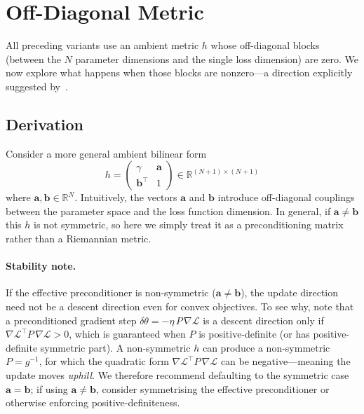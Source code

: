 \documentclass{article}
\newcommand{\loss}{\mathcal{L}}
\newcommand{\vecb}[1]{\boldsymbol{#1}}
\begin{document}
\section{Off-Diagonal Metric}\label{sec:offdiag}

All preceding variants use an ambient metric $h$ whose off-diagonal blocks
(between the $N$ parameter dimensions and the single loss dimension) are zero.
We now explore what happens when those blocks are nonzero---a direction explicitly
suggested by~\cite{harvey2025}.

\subsection{Derivation}

Consider a more general ambient bilinear form $$
    h = \begin{pmatrix} \gamma & \vecb{a} \\ \vecb{b}^\top & 1 \end{pmatrix}\in\mathbb{R}^{(N+1)\times(N+1)}
$$ where $\vecb{a},\vecb{b}\in\mathbb{R}^N$.
Intuitively, the vectors $\vecb{a}$ and $\vecb{b}$ introduce off-diagonal couplings between the parameter space and the loss function dimension.
In general, if $\vecb{a}\neq \vecb{b}$ this $h$ is not symmetric, so here we simply treat it as a preconditioning matrix rather than a Riemannian metric.

\paragraph{Stability note.}
If the effective preconditioner is non-symmetric ($\vecb{a}\neq\vecb{b}$),
the update direction need not be a descent direction even for convex objectives.
To see why, note that a preconditioned gradient step $\delta\theta = -\eta\,P\,\nabla\loss$
is a descent direction only if $\nabla\loss^\top P\,\nabla\loss > 0$,
which is guaranteed when $P$ is positive-definite (or has positive-definite symmetric part).
A non-symmetric $h$ can produce a non-symmetric~$P = g^{-1}$,
for which the quadratic form $\nabla\loss^\top P\,\nabla\loss$ can be negative---meaning
the update moves \emph{uphill}.
We therefore recommend defaulting to the symmetric case $\vecb{a}=\vecb{b}$;
if using $\vecb{a}\neq\vecb{b}$, consider symmetrising the effective preconditioner
or otherwise enforcing positive-definiteness.
\end{document}
